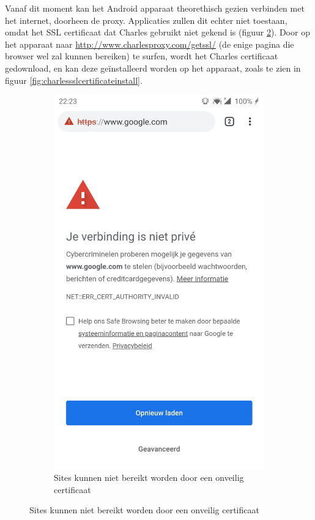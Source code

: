 Vanaf dit moment kan het Android apparaat theorethisch gezien verbinden met het internet, doorheen de proxy. Applicaties zullen dit echter niet toestaan, omdat het SSL certificaat dat Charles gebruikt niet gekend is (figuur \ref{fig:charlescantconnect}). Door op het apparaat naar \url{http://www.charlesproxy.com/getssl/} (de enige pagina die browser wel zal kunnen bereiken) te surfen, wordt het Charles certificaat gedownload, en kan deze geïnstalleerd worden op het apparaat, zoals te zien in figuur \ref{fig:charlessslcertificateinstall}.

\begin{figure}
    \centering
    \begin{subfigure}{.5\textwidth}
        \centering
        \includegraphics[width=0.8\linewidth]{img/charlescantconnect.jpg}
        \caption{Sites kunnen niet bereikt worden door een onveilig certificaat}
        \label{fig:charlescantconnect}

\end{subfigure}
\end{figure}
